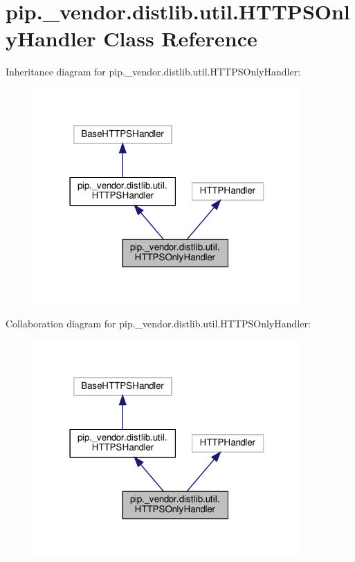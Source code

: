 \hypertarget{classpip_1_1__vendor_1_1distlib_1_1util_1_1HTTPSOnlyHandler}{}\section{pip.\+\_\+vendor.\+distlib.\+util.\+H\+T\+T\+P\+S\+Only\+Handler Class Reference}
\label{classpip_1_1__vendor_1_1distlib_1_1util_1_1HTTPSOnlyHandler}


Inheritance diagram for pip.\+\_\+vendor.\+distlib.\+util.\+H\+T\+T\+P\+S\+Only\+Handler\+:
\nopagebreak
\begin{figure}[H]
\begin{center}
\leavevmode
\includegraphics[width=290pt]{classpip_1_1__vendor_1_1distlib_1_1util_1_1HTTPSOnlyHandler__inherit__graph}
\end{center}
\end{figure}


Collaboration diagram for pip.\+\_\+vendor.\+distlib.\+util.\+H\+T\+T\+P\+S\+Only\+Handler\+:
\nopagebreak
\begin{figure}[H]
\begin{center}
\leavevmode
\includegraphics[width=290pt]{classpip_1_1__vendor_1_1distlib_1_1util_1_1HTTPSOnlyHandler__coll__graph}
\end{center}
\end{figure}
